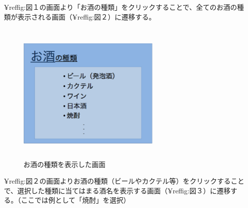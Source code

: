 \documentclass[a4j,titlepage]{jarticle}
\begin{document}
¥ref{fig:図１}の画面より「お酒の種類」をクリックすることで、全てのお酒の種類が表示される画面（¥ref{fig:図２}）に遷移する。
\clearpage
\begin {figure}[!htbp]
    \begin{center}
    \includegraphics [height=7cm, width=7cm]{2.eps}
    \caption {お酒の種類を表示した画面}
    \label {fig:2}
    \end{center}
\end {figure}


¥ref{fig:図２}の画面よりお酒の種類（ビールやカクテル等）をクリックすることで、選択した種類に当てはまる酒名を表示する画面（¥ref{fig:図３}）に遷移する。（ここでは例として「焼酎」を選択）
\end{document}
